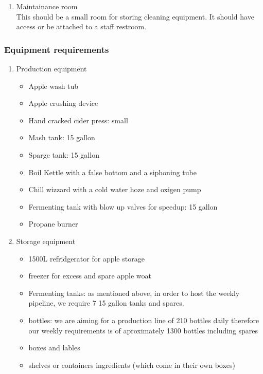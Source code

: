 \documentclass[11pt]{article}
\begin{document}
\begin{enumerate}
  \item Maintainance room\\
  This should be a small room for storing cleaning equipment. It should have access or be attached to a staff restroom.
  \end{enumerate}

    \subsubsection{Equipment requirements}
    \begin{enumerate}
    \item Production equipment
      \begin{itemize}
      \item Apple wash tub
      \item Apple crushing device
      \item Hand cracked cider press: small
      \item Mash tank: 15 gallon
      \item Sparge tank: 15 gallon
      \item Boil Kettle with a false bottom and a siphoning tube
      \item Chill wizzard with a cold water hoze and oxigen pump
      \item Fermenting tank with blow up valves for speedup: 15 gallon
      \item Propane burner
      \end{itemize}

    \item Storage equipment
      \begin{itemize}
      \item 1500L refridgerator for apple storage
      \item freezer for excess and spare apple woat
      \item Fermenting tanks: as mentioned above, in order to host the weekly pipeline, we require 7 15 gallon tanks and spares.
      \item bottles: we are aiming for a production line of 210 bottles daily therefore our weekly requirements is of aproximately 1300 bottles including spares
      \item boxes and lables
      \item shelves or containers ingredients (which come in their own boxes)
      \end{itemize}


\end{enumerate}
\end{document}
